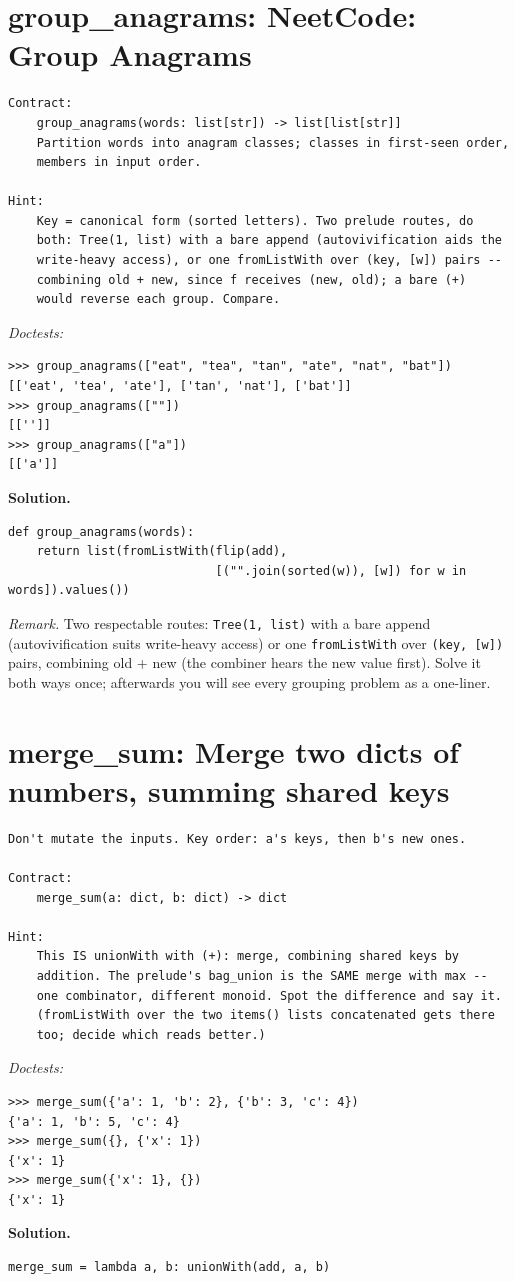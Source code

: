 \documentclass[11pt,letterpaper]{book}
\begin{document}
\section{group\_anagrams: NeetCode: Group Anagrams}
\begin{lstlisting}[style=spec]
Contract:
    group_anagrams(words: list[str]) -> list[list[str]]
    Partition words into anagram classes; classes in first-seen order,
    members in input order.

Hint:
    Key = canonical form (sorted letters). Two prelude routes, do
    both: Tree(1, list) with a bare append (autovivification aids the
    write-heavy access), or one fromListWith over (key, [w]) pairs --
    combining old + new, since f receives (new, old); a bare (+)
    would reverse each group. Compare.
\end{lstlisting}
\noindent\textit{Doctests:}
\begin{lstlisting}[style=spec]
>>> group_anagrams(["eat", "tea", "tan", "ate", "nat", "bat"])
[['eat', 'tea', 'ate'], ['tan', 'nat'], ['bat']]
>>> group_anagrams([""])
[['']]
>>> group_anagrams(["a"])
[['a']]
\end{lstlisting}
\noindent\textbf{Solution.}
\begin{lstlisting}[style=code]
def group_anagrams(words):
    return list(fromListWith(flip(add),
                             [("".join(sorted(w)), [w]) for w in words]).values())
\end{lstlisting}

\noindent\textit{Remark.} Two respectable routes: \texttt{Tree(1, list)} with a
bare append (autovivification suits write-heavy access) or one
\texttt{fromListWith} over \texttt{(key, [w])} pairs, combining old + new
(the combiner hears the new value first). Solve it both ways once; afterwards
you will see every grouping problem as a one-liner.

\section{merge\_sum: Merge two dicts of numbers, summing shared keys}
\begin{lstlisting}[style=spec]
Don't mutate the inputs. Key order: a's keys, then b's new ones.

Contract:
    merge_sum(a: dict, b: dict) -> dict

Hint:
    This IS unionWith with (+): merge, combining shared keys by
    addition. The prelude's bag_union is the SAME merge with max --
    one combinator, different monoid. Spot the difference and say it.
    (fromListWith over the two items() lists concatenated gets there
    too; decide which reads better.)
\end{lstlisting}
\noindent\textit{Doctests:}
\begin{lstlisting}[style=spec]
>>> merge_sum({'a': 1, 'b': 2}, {'b': 3, 'c': 4})
{'a': 1, 'b': 5, 'c': 4}
>>> merge_sum({}, {'x': 1})
{'x': 1}
>>> merge_sum({'x': 1}, {})
{'x': 1}
\end{lstlisting}
\noindent\textbf{Solution.}
\begin{lstlisting}[style=code]
merge_sum = lambda a, b: unionWith(add, a, b)
\end{lstlisting}
\end{document}
